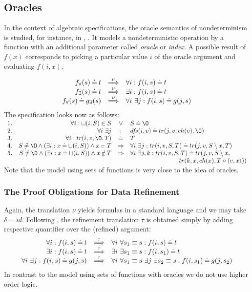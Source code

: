 \subsection{Oracles}
In the context of algebraic specifications, the oracle semantics of nondeterminism is studied, for instance, in \cite{Mich}, \cite{top}. It models a nondeterministic 
operation by a function with an additional parameter called {\em oracle} or {\em index}. A possible result of $f(x)$ corresponds to picking a particular value $i$ of the oracle argument and evaluating $f(i,x).$ 

\begin{equation}\label{eq:oraclenu}
\begin{array}{rcl}
f_\forall(s) \mathbin{\doteq} t & \mathbin{\stackrel{\nu}{\Longrightarrow}} & \forall i: f(i,s)\mathbin{\doteq} t \\ f_\exists(s) \mathbin{\doteq} t & \mathbin{\stackrel{\nu}{\Longrightarrow}} & \exists i: f(i,s)\mathbin{\doteq} t\\ f_\forall(s) \mathbin{\doteq} g_\exists(s) & \mathbin{\stackrel{\nu}{\Longrightarrow}} &
\forall i\ \exists j : f(i,s)\mathbin{\doteq} g(j,s) \\ \end{array}
\end{equation}
\noindent The specification looks now as follows:\\[1ex] \(\begin{array}{rrcl}
1.& \forall i : \ch(i,S)\in S & \lor & S\Eq\es \\ 2. & \forall i\ \exists j & : & \dfs(i,v)\Eq tr(j,v,ch(v),\es)\ \ \\ 3. & \forall i : tr(i,v,\es,T) & \Eq & T \\ 4. & S\Not\Eq\es\land (\exists i: x\Eq \ch(i,S))\land x\lin T & \impl & \forall i\ \exists j :tr(i,v,S,T)\Eq tr(j,v,S\setminus x,T) \\ 5. & S\Not\Eq\es\land (\exists i: x\Eq \ch(i,S))\land x\Not\lin T & \impl & \forall i\ \exists j,k :tr(i,v,S,T)\Eq 
tr(j,v,S\setminus x,\ \ \ \ \ \ \ \ \\
\multicolumn{4}{r}{tr(k,x,ch(x),T\ap\<v,x\>))} \end{array} \)\\[1ex]
\noindent
Note that the model using sets of functions is very close to the idea of oracles.
\subsubsection{The Proof Obligations for Data Refinement} Again, the translation $\nu$ yields formulas in a standard language and we may take $\delta = id.$ Following , the refinement translation $\tau$ is obtained simply by adding respective quantifier over the (refined) argument: \begin{equation}\label{eq:oracletau}
\begin{array}{rcl}
\forall i: f(i,s)\Eq t & \TTo{\tau} &
\forall i\ \forall s_1\equiv s: f(i,s)\Eq t \\ \exists i: f(i,s)\Eq t & \TTo{\tau} &
\exists i\ \exists s_1\equiv s: f(i,s_1)\Eq t\\ \forall i\ \exists j : f(i,s)\Eq g(j,s) & \TTo{\tau} & \forall i\ \forall s_1\equiv s\ \exists j\ \exists s_2\equiv s:f(i,s_1)\Eq g(j,s_2)
\end{array}
\end{equation}
In contrast to the model using sets of functions with oracles we do not use higher order logic.
